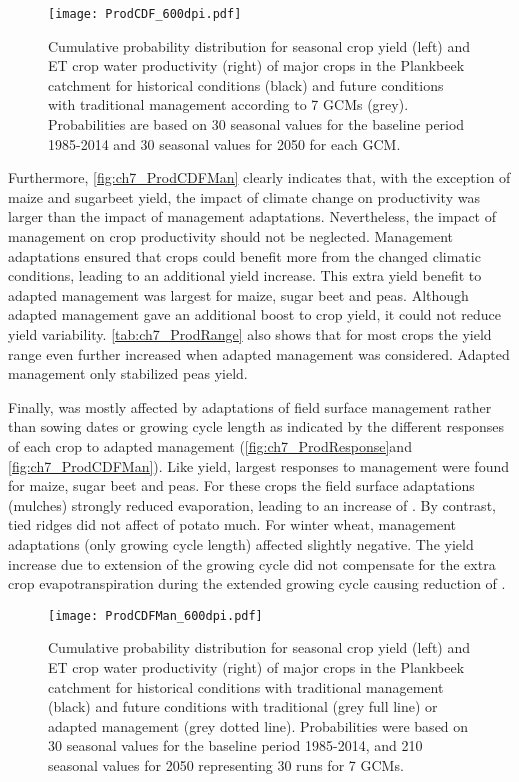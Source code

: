 \begin{figure}[tbhp]
	\centering
		\texttt{[image: ProdCDF\_600dpi.pdf]}
	\caption{Cumulative probability distribution for seasonal crop yield (left) and ET crop water productivity (right) of major crops in the Plankbeek catchment for historical conditions (black) and future conditions with traditional management according to 7 GCMs (grey). Probabilities are based on 30 seasonal values for the baseline period 1985-2014 and 30 seasonal values for 2050 for each GCM.}
	\label{fig:ch7_ProdCDF}
\end{figure}

Furthermore, \autoref{fig:ch7_ProdCDFMan} clearly indicates that, with the exception of maize and sugarbeet yield, the impact of climate change on productivity was larger than the impact of management adaptations. Nevertheless, the impact of management on crop productivity should not be neglected. Management adaptations ensured that crops could benefit more from the changed climatic conditions, leading to an additional yield increase. This extra yield benefit to adapted management was largest for maize, sugar beet and peas. Although adapted management gave an additional boost to crop yield, it could not reduce yield variability. \autoref{tab:ch7_ProdRange} also shows that for most crops the yield range even further increased when adapted management was considered. Adapted management only stabilized peas yield. 

Finally, \WPET was mostly affected by adaptations of field surface management rather than sowing dates or growing cycle length as indicated by the different \WPET responses of each crop to adapted management (\autoref{fig:ch7_ProdResponse}and \autoref{fig:ch7_ProdCDFMan}). Like yield, largest \WPET responses to management were found for maize, sugar beet and peas. For these crops the field surface adaptations (mulches) strongly reduced evaporation, leading to an increase of \WPET. By contrast, tied ridges did not affect \WPET of potato much. For winter wheat, management adaptations (only growing cycle length) affected \WPET slightly negative. The yield increase due to extension of the growing cycle did not compensate for the extra crop evapotranspiration during the extended growing cycle causing reduction of \WPET. 


\begin{figure}[tbhp]
	\centering
		\texttt{[image: ProdCDFMan\_600dpi.pdf]}
	\caption{Cumulative probability distribution for seasonal crop yield (left) and ET crop water productivity (right) of major crops in the Plankbeek catchment for historical conditions with traditional management (black) and future conditions with traditional (grey full line) or adapted management (grey dotted line). Probabilities were based on 30 seasonal values for the baseline period 1985-2014,  and 210 seasonal values for 2050 representing 30 runs for 7 GCMs.}
	\label{fig:ch7_ProdCDFMan}
\end{figure}

